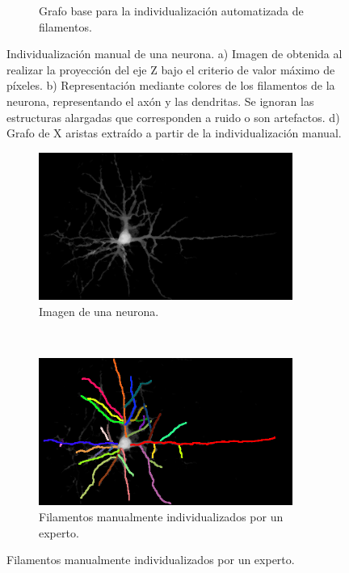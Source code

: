 \begin{figure}[h!]
\begin{subfigure}[t]{0.5\textwidth}
        \caption{Grafo base para la individualizaci\'on automatizada de filamentos.}
        \label{fig:Porta6-4a1-graph}
    \end{subfigure}
    \caption[Muestra N1 con su individualizaci\'on manual de una neurona de rat\'on.]{Individualizaci\'on manual de una neurona. a) Imagen de \citet{ampuero2019chronic} obtenida al realizar la proyecci\'on del eje Z bajo el criterio de valor m\'aximo de p\'ixeles. b) Representaci\'on mediante colores de los filamentos de la neurona, representando el ax\'on y las dendritas. Se ignoran las estructuras alargadas que corresponden a ruido o son artefactos. d) Grafo de X aristas extra\'ido a partir de la individualizaci\'on manual.}
    \label{fig:Porta6-4a1}
\end{figure}

\begin{figure}[h!]
    \centering
    \begin{subfigure}[t]{0.49\textwidth}
        \centering
        \includegraphics[height=1.9in]{benchImages/grupo1-Porta10-5b-AVG-partialCleaned.png}
        \caption{Imagen de una neurona.}
        \label{fig:Porta10-5b-og}
    \end{subfigure}
    ~ 
    \begin{subfigure}[t]{0.49\textwidth}
        \centering
        \includegraphics[height=1.9in]{benchImages/grupo1-Porta10-5b-AVG-partialCleaned-colorCoded.png}
        \caption{Filamentos manualmente individualizados por un experto.}
        \label{fig:Porta10-5b-gt}
    \end{subfigure}

\end{figure}
